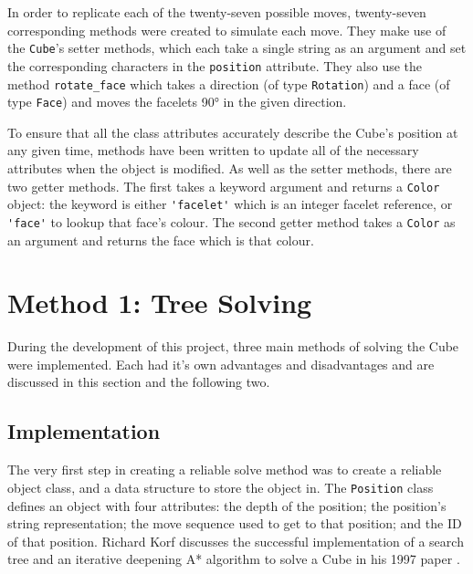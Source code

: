 \documentclass{report}
\begin{document}
    In order to replicate each of the twenty-seven possible moves, twenty-seven corresponding methods were created to simulate each move. They make use of the \lstinline|Cube|'s setter methods, which each take a single string as an argument and set the corresponding characters in the \lstinline|position| attribute. They also use the method \lstinline|rotate_face| which takes a direction (of type \lstinline|Rotation|) and a face (of type \lstinline|Face|) and moves the facelets \ang{90} in the given direction.
    
    To ensure that all the class attributes accurately describe the Cube's position at any given time, methods have been written to update all of the necessary attributes when the object is modified. As well as the setter methods, there are two getter methods. The first takes a keyword argument and returns a \lstinline|Color| object: the keyword is either \lstinline|'facelet'| which is an integer facelet reference, or \lstinline|'face'| to lookup that face's colour. The second getter method takes a \lstinline|Color| as an argument and returns the face which is that colour.
    
    \section{Method 1: Tree Solving} \label{sec:treeSolving}
    
    During the development of this project, three main methods of solving the Cube were implemented. Each had it's own advantages and disadvantages and are discussed in this section and the following two.
    
    \subsection{Implementation} \label{sec:treeSolveImplementation}
    
    The very first step in creating a reliable solve method was to create a reliable object class, and a data structure to store the object in. The \lstinline|Position| class defines an object with four attributes: the depth of the position; the position's string representation; the move sequence used to get to that position; and the ID of that position. Richard Korf discusses the successful implementation of a search tree and an iterative deepening A* algorithm to solve a Cube in his 1997 paper \cite{Korf1997}. 
    
\end{document}
